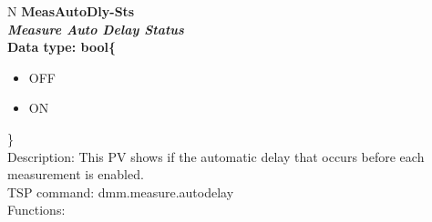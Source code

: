 \documentclass[openany]{article}
\begin{document}
		\begin{tabular}{N}
			\hline
			\bfseries MeasAutoDly-Sts\label{pv:measautodly-sts} \\ \hline
			\emph{Measure Auto Delay Status} \\
			Data type: bool\{\begin{itemize}[noitemsep]
				\small
				\item[] OFF
				\item[] ON
			\end{itemize}\} \\
			Description: This PV shows if the automatic delay that occurs before each measurement is enabled. \\
			TSP command: dmm.measure.autodelay \\
			Functions: \\
			\arrayrulecolor{\FuncTableBorderColor}

		\end{tabular}
\end{document}
